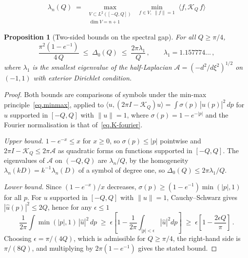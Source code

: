 \documentclass[10pt,a4paper]{amsart}
\newtheorem{proposition}{Proposition}
\begin{document}
\begin{equation}\label{eq.minmax}
    \lambda_n(Q)
    \;=\;
    \max_{\substack{V \subset L^2([-Q,Q]) \\[1pt] \dim V = n+1}}
    \;\min_{f \in V,\; \|f\|=1}
    \;\langle f, \mathcal{K}_Q\, f \rangle
\end{equation}

\begin{proposition}[Two-sided bounds on the spectral gap]\label{prop:gap}
  For all $Q \geq \pi/4$,
  \begin{equation}\label{eq.gap-upper}
    \frac{\pi^2\left(1 - e^{-1}\right)}{4\,Q}
    \;\leq\;
    \Delta_0(Q)
    \;\leq\;
    \frac{2\pi\lambda_1}{Q}\,,
    \qquad \lambda_1 = 1.157774\ldots\,,
  \end{equation}
  where $\lambda_1$ is the smallest eigenvalue of the half-Laplacian
  $\mathcal{A} = (-d^2/d\xi^2)^{1/2}$ on $(-1,1)$ with exterior Dirichlet
  condition.
\end{proposition}

\begin{proof}
Both bounds are comparisons of symbols under the min-max
principle~\eqref{eq.minmax}, applied to
$\langle u, (2\pi I - \mathcal{K}_Q)u\rangle
= \int \sigma(p)\,|\hat u(p)|^2\,dp$ for $u$ supported in $[-Q,Q]$ with
$\|u\| = 1$, where $\sigma(p) = 1-e^{-|p|}$ and the Fourier normalisation is
that of~\eqref{eq.K-fourier}.

\emph{Upper bound.}  $1-e^{-x} \leq x$ for $x \geq 0$, so
$\sigma(p) \leq |p|$ pointwise and $2\pi I - \mathcal{K}_Q \leq 2\pi\mathcal{A}$
as quadratic forms on functions supported in $[-Q,Q]$.  The eigenvalues of
$\mathcal{A}$ on $(-Q,Q)$ are $\lambda_n/Q$, by the homogeneity
$\lambda_n(kD) = k^{-1}\lambda_n(D)$ of a symbol of degree one, so
$\Delta_0(Q) \leq 2\pi\lambda_1/Q$.

\emph{Lower bound.}  Since $(1-e^{-x})/x$ decreases,
$\sigma(p) \geq (1-e^{-1})\min(|p|,1)$ for all $p$.  For $u$ supported in
$[-Q,Q]$ with $\|u\|=1$, Cauchy--Schwarz gives $|\hat u(p)|^2 \leq 2Q$, hence
for any $\epsilon \leq 1$
\begin{equation}
  \frac{1}{2\pi}\int \min(|p|,1)\,|\hat u|^2\,dp
  \;\geq\; \epsilon\left[1 - \frac{1}{2\pi}\int_{|p|<\epsilon}|\hat u|^2 dp\right]
  \;\geq\; \epsilon\left[1 - \frac{2\epsilon Q}{\pi}\right]\,.
\end{equation}
Choosing $\epsilon = \pi/(4Q)$, which is admissible for $Q \geq \pi/4$, the
right-hand side is $\pi/(8Q)$, and multiplying by $2\pi(1-e^{-1})$ gives the
stated bound.
\end{proof}
\end{document}
